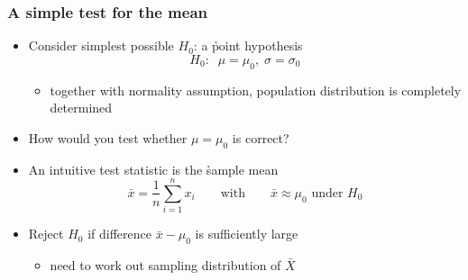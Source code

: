 \documentclass[t]{beamer} %
\begin{document}
\begin{frame}
  \frametitle{A simple test for the mean}

  \begin{itemize}
  \item Consider simplest possible $H_0$: a \h{point hypothesis}
    \[
    H_0:\;\; \mu = \mu_0,\; \sigma = \sigma_0
    \]
    \ungap[1]
    \begin{itemize}
    \item[\hand] together with normality assumption, population distribution
      is completely determined
    \end{itemize}
  \item How would you test whether $\mu = \mu_0$ is correct?%
    \pause
  \item An intuitive test statistic is the \h{sample mean}
    \[
    \bar{x} = \frac{1}{n} \sum_{i=1}^n x_i
    \qquad \text{with} \qquad
    \bar{x}\approx \mu_0 \text{ under } H_0
    \]
  \item Reject $H_0$ if difference $\bar{x} - \mu_0$ is sufficiently large
    \begin{itemize}
    \item[\hand] need to work out sampling distribution of $\bar{X}$
    \end{itemize}
  \end{itemize}

\end{frame}
\end{document}
